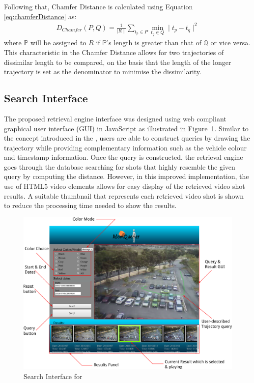 Following that, Chamfer Distance is calculated using Equation
\ref{eq:chamferDistance} as:
\begin{align}
\label{eq:chamferDistance}
D_{Chamfer} (P,Q) = \frac{1}{\mid R \mid} \sum_{t_p \in P} \min_{t_q \in Q}  \mid t_p - t_q \mid^{2}
\end{align}
where $\mathbb{P}$ will be assigned to $R$ if $\mathbb{P}$'s length is greater than that of $\mathbb{Q}$ or vice versa. This characteristic in the Chamfer Distance allows for two trajectories of dissimilar length to be compared, on the basis that the length of the longer trajectory is set as the denominator to minimise the dissimilarity. 

\vspace{1em}
\subsection{Search Interface}
The proposed retrieval engine interface was designed using web compliant graphical user interface (GUI) in JavaScript as illustrated in Figure~\ref{fig:versionTwoInterface}. Similar to the concept introduced in the \versionOneRet, users are able to construct queries by drawing the trajectory while providing complementary information such as the vehicle colour and timestamp information. Once the query is constructed, the retrieval engine goes through the database searching for shots that highly resemble the given query by computing the
distance. However, in this improved implementation, the use of HTML5 video elements allows for easy display of the retrieved video shot results. A suitable thumbnail that represents each retrieved video shot is shown to reduce the processing time needed to show the results. %

\begin{figure}[tb!]\centering
\includegraphics[width=\textwidth]{image/retrievalTwo/VISERinterface2.png}
\caption{Search Interface for \versionTwoRet}
\label{fig:versionTwoInterface}
\end{figure}

